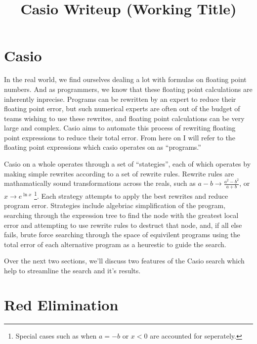 \documentclass{article}
\title{Casio Writeup (Working Title)}
\begin{document}
\maketitle

\section{Casio}

In the real world, 
we find ourselves dealing a lot with formulas 
on floating point numbers. 
And as programmers, 
we know that these floating point calculations 
are inherently inprecise. 
Programs can be rewritten by an expert to reduce their floating point error, 
but such numerical experts are often out of the budget of teams wishing to use these rewrites, 
and floating point calculations can be very large and complex. 
Casio aims to automate this process of rewriting floating point expressions 
to reduce their total error. 
From here on I will refer to the floating point expressions 
which casio operates on 
as ``programs.''

Casio on a whole operates through a set of ``stategies'', 
each of which operates by making simple rewrites according to a set of rewrite rules. 
Rewrite rules are mathamatically sound transformations across the reals, 
such as $a - b \to \frac{a^2 - b^2}{a + b}$, 
or $x \to e^{\ln{x}}$
\footnote{Special cases such as when $a = -b$ or $x < 0$ are accounted for seperately.}.
Each strategy attempts to apply the best rewrites 
and reduce program error. 
Strategies include algebriac simplification of the program, 
searching through the expression tree to find the node with the greatest local error 
and attempting to use rewrite rules to destruct that node, 
and, if all else fails, 
brute force searching through the space of equivilent programs 
using the total error of each alternative program 
as a heurestic to guide the search.

Over the next two sections,
we'll discuss two features of the Casio search
which help to streamline the search and it's results.

\section{Red Elimination}
\end{document}
